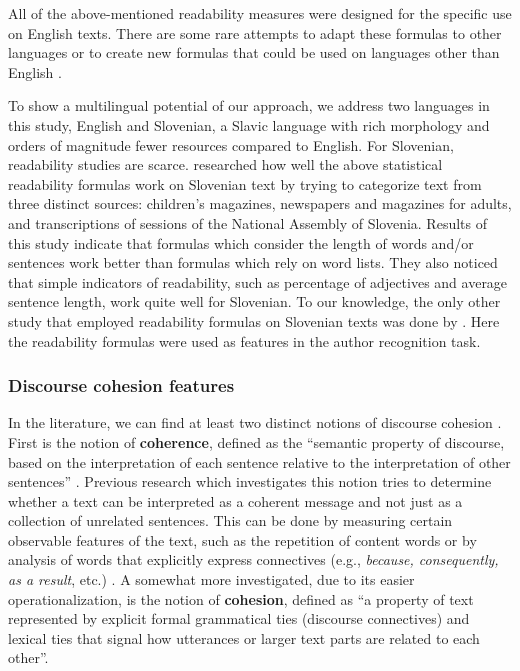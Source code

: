 \documentclass{clv3}
\begin{document}
All of the above-mentioned readability measures were designed for the specific use on English texts. There are some rare attempts to adapt these formulas to other languages \citep{kandel1958application} or to create new formulas that could be used on languages other than English \citep{anderson1981analysing}. 

To show a multilingual potential of our approach, we address two languages in this study, English and Slovenian, a Slavic language with rich morphology and orders of magnitude fewer resources compared to English. 
For Slovenian, readability studies are scarce. \citet{vskvorcevaluation} researched how well the above statistical readability formulas work on Slovenian text by trying to categorize text from three distinct sources: children's magazines, newspapers and magazines for adults, and transcriptions of sessions of the National Assembly of Slovenia. Results of this study indicate that formulas which consider the length of words and/or sentences work better than formulas which rely on word lists. They also noticed that simple indicators of readability, such as percentage of adjectives and average sentence length, work quite well for Slovenian. To our knowledge, the only other study that employed readability formulas on Slovenian texts was done by \citet{vitez2014ugotavljanje}. Here the readability formulas were used as features in the author recognition task.

\subsubsection{Discourse cohesion features}
\label{sec:discourse-cohesion}

In the literature, we can find at least two distinct notions of discourse cohesion \citep{todirascu-etal-2016-cohesive}. First is the notion of \textbf{coherence}, defined as the ``semantic property of discourse, based on the interpretation of each sentence relative to the interpretation of other sentences'' \citep{van1977text}. Previous research which investigates this notion tries to determine whether a text can be interpreted as a coherent message and not just as a collection of unrelated sentences. This can be done by measuring certain observable features of the text, such as the repetition of content words or by analysis of words that explicitly express connectives (e.g., \textit{because, consequently, as a result}, etc.) \citep{sheehan2014textevaluator}. A somewhat more investigated, due to its easier operationalization, is the notion of \textbf{cohesion}, defined as ``a property of text represented by explicit formal grammatical ties (discourse connectives) and lexical ties that signal how utterances or larger text parts are related to each other''. 
\end{document}
